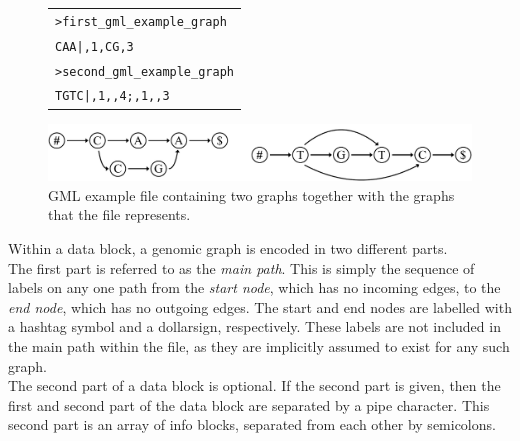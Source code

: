 \documentclass[a4paper,12pt,twoside,BCOR=10mm]{scrbook}
\begin{document}
\begin{figure}[!htb]
\centering
\begin{tabularx}{1.0\textwidth}{ | X | }
\hline
\texttt{>first\_gml\_example\_graph} \\
\texttt{CAA|,1,CG,3} \\
\texttt{>second\_gml\_example\_graph} \\
\texttt{TGTC|,1,,4;,1,,3} \\
\hline
\end{tabularx}
\includegraphics[width=\textwidth]{evo_fig_second_gml_example.pdf}
\caption[GML example file containing two graphs]{GML example file containing two graphs together with the graphs that the file represents.} \label{fig:evo_fig_second_gml_example}
\end{figure}

Within a data block, a genomic graph is encoded in two different parts. \\
The first part is referred to as the \textit{main path}.
This is simply the sequence of labels on any one path from the \textit{start node},
which has no incoming edges, to the \textit{end node}, which has no outgoing edges.
The start and end nodes are labelled with a hashtag symbol and a dollarsign, respectively.
These labels are not included in the main path within the file, as they are implicitly assumed
to exist for any such graph. \\
The second part of a data block is optional.
If the second part is given, then the first and second part of the data block are separated by a pipe character.
This second part is an array of info blocks, separated from each other by semicolons.
\end{document}
